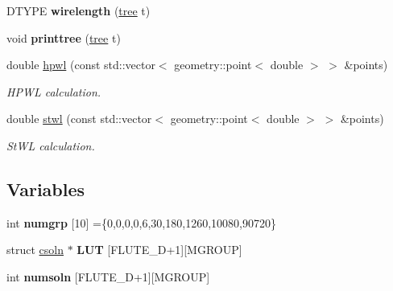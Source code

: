 \begin{DoxyCompactItemize}
\item 
\hypertarget{namespaceophidian_1_1interconnection_aafc2acc4cced869e1901dac341c06080}{D\-T\-Y\-P\-E {\bfseries wirelength} (\hyperlink{structophidian_1_1interconnection_1_1tree}{tree} t)}\label{namespaceophidian_1_1interconnection_aafc2acc4cced869e1901dac341c06080}

\item 
\hypertarget{namespaceophidian_1_1interconnection_a5cddd51e3f6f16752c84ed9471fd4ce5}{void {\bfseries printtree} (\hyperlink{structophidian_1_1interconnection_1_1tree}{tree} t)}\label{namespaceophidian_1_1interconnection_a5cddd51e3f6f16752c84ed9471fd4ce5}

\item 
double \hyperlink{namespaceophidian_1_1interconnection_a2cbfe985312eaa1afe39a7602df8a68b}{hpwl} (const std\-::vector$<$ geometry\-::point$<$ double $>$ $>$ \&points)
\begin{DoxyCompactList}\small\item\em H\-P\-W\-L calculation. \end{DoxyCompactList}\item 
double \hyperlink{namespaceophidian_1_1interconnection_aa96a309fc4b8d957125433cbf9204358}{stwl} (const std\-::vector$<$ geometry\-::point$<$ double $>$ $>$ \&points)
\begin{DoxyCompactList}\small\item\em St\-W\-L calculation. \end{DoxyCompactList}\end{DoxyCompactItemize}
\subsection*{Variables}
\begin{DoxyCompactItemize}
\item 
\hypertarget{namespaceophidian_1_1interconnection_a4971c5289256d5a6c52e4c33c1522946}{int {\bfseries numgrp} \mbox{[}10\mbox{]} =\{0,0,0,0,6,30,180,1260,10080,90720\}}\label{namespaceophidian_1_1interconnection_a4971c5289256d5a6c52e4c33c1522946}

\item 
\hypertarget{namespaceophidian_1_1interconnection_ac1019eb927a987b3fc441b4780f3e39a}{struct \hyperlink{structophidian_1_1interconnection_1_1csoln}{csoln} $\ast$ {\bfseries L\-U\-T} \mbox{[}F\-L\-U\-T\-E\-\_\-\-D+1\mbox{]}\mbox{[}M\-G\-R\-O\-U\-P\mbox{]}}\label{namespaceophidian_1_1interconnection_ac1019eb927a987b3fc441b4780f3e39a}

\item 
\hypertarget{namespaceophidian_1_1interconnection_abb432985df6a870a130521f3fa43b773}{int {\bfseries numsoln} \mbox{[}F\-L\-U\-T\-E\-\_\-\-D+1\mbox{]}\mbox{[}M\-G\-R\-O\-U\-P\mbox{]}}\label{namespaceophidian_1_1interconnection_abb432985df6a870a130521f3fa43b773}

\end{DoxyCompactItemize}



